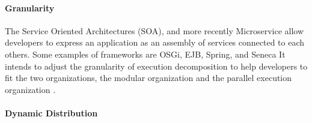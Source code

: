 


\paragraph{Granularity}

The Service Oriented Architectures (SOA), and more recently Microservice\cite{Namiot2014,Fernandez-Villamor2010,Fowler2014,Namiot2014} allow developers to express an application as an assembly of services connected to each others.
Some examples of frameworks are OSGi, EJB, Spring, and Seneca
It intends to adjust the granularity of execution decomposition to help developers to fit the two organizations, the modular organization and the parallel execution organization \cite{Adam2008}.



\paragraph{Dynamic Distribution}

